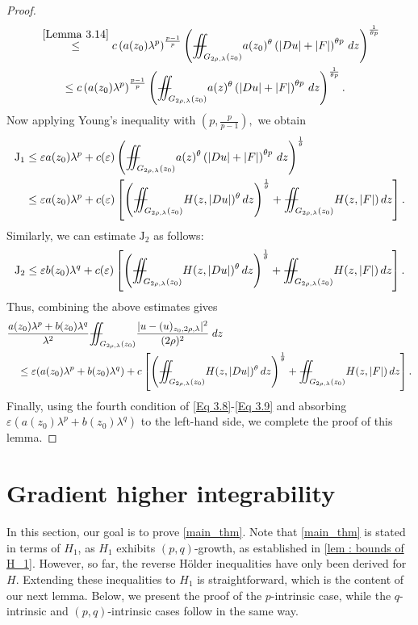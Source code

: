 \documentclass[11pt,oneside, english,reqno,twoside a4paper]{amsart}
\theoremstyle{definition}
\numberwithin{theorem}{section}
\numberwithin{equation}{section}
\newcommand{\iintss}{{\int\hspace{-0.28cm}\int}}
\newcommand{ \miints }{{\iintss\hspace{-0.56cm} -\hspace{-0.15cm}-}}
\newcommand{\miint}[1]{{\miints_{\hspace{-0.13cm}#1}}}
\begin{document}
\begin{proof}
\begin{align*}
 &\overset{\cref{Lemma 3.14}}{\leq} c \left(a(z_0)\lambda^p\right)^{\frac{p-1}{p}} \left(\miint{G_{2\rho, \lambda}(z_0)}a(z_0)^{\theta}\left(|Du|+|F|\right)^{\theta p}\,dz\right)^{\frac{1}{\theta p}}\\
 &\qquad\leq c \left(a(z_0)\lambda^p\right)^{\frac{p-1}{p}}\left(\miint{G_{2\rho, \lambda}(z_0)}a(z)^{\theta}\left(|Du|+|F|\right)^{\theta p}\,dz\right)^{\frac{1}{\theta p}}.
\end{align*}
Now applying Young's inequality with $(p, \frac{p}{p-1}),$ we obtain
\begin{align*}
    \mathrm{J}_1 &\leq \varepsilon a(z_0)\lambda^{p}+ c(\varepsilon)\left(\miint{G_{2\rho, \lambda}(z_0)}a(z)^{\theta}\left(|Du|+|F|\right)^{\theta p}\,dz\right)^{\frac{1}{\theta }}\\
    &\leq \varepsilon  a(z_0)\lambda^p+ c(\varepsilon)\left[\left(\miint{G_{2 \rho,\lambda}\left(z_0\right)} H(z, |Du|)^{\theta}\, dz\right)^{\frac{1}{\theta}}+\miint{G_{2\rho, \lambda}(z_0)}H(z, |F|)\, dz\right].
\end{align*}
Similarly, we can estimate $\mathrm{J}_2$ as follows:
\begin{align*}
    \mathrm{J}_2 \leq \varepsilon b(z_0)\lambda^q + c(\varepsilon)\left[\left(\miint{G_{2 \rho,\lambda}\left(z_0\right)} H(z, |Du|)^{\theta}\, dz\right)^{\frac{1}{\theta}}+\miint{G_{2\rho, \lambda}(z_0)}H(z, |F|)\, dz\right].
\end{align*}
Thus, combining the above estimates gives
\begin{align*}
 &\frac{a(z_0)\lambda^p+b(z_0)\lambda^q}{\lambda^2}\miint{G_{2\rho, \lambda}(z_0)}\frac{|u-(u)_{z_0, 2\rho, \lambda}|^2}{(2\rho)^2}\;dz \\
 &\quad \leq \varepsilon (a(z_0)\lambda^p+b(z_0)\lambda^q)+c\left[\left(\miint{G_{2 \rho,\lambda}\left(z_0\right)} H(z, |Du|)^{\theta}\, dz\right)^{\frac{1}{\theta}}+\miint{G_{2\rho, \lambda}(z_0)}H(z, |F|)\, dz\right] . 
\end{align*}
Finally, using the fourth condition of \eqref{Eq 3.8}-\eqref{Eq 3.9} and absorbing $\varepsilon (a(z_0)\lambda^p+b(z_0)\lambda^q)$ to the left-hand side, we complete the proof of this lemma.
\end{proof}




\section{Gradient higher integrability}\label{Sec:Higher_Integrability} In this section, our goal is to prove \cref{main_thm}. Note that \cref{main_thm} is stated in terms of $H_1$, as $H_1$ exhibits $(p,q)$-growth, as established in \cref{lem : bounds of H_1}. However, so far, the reverse Hölder inequalities have only been derived for $H$. Extending these inequalities to $H_1$ is straightforward, which is the content of our next lemma. Below, we present the proof of the $p$-intrinsic case, while the $q$-intrinsic and $(p,q)$-intrinsic cases follow in the same way.
\end{document}
